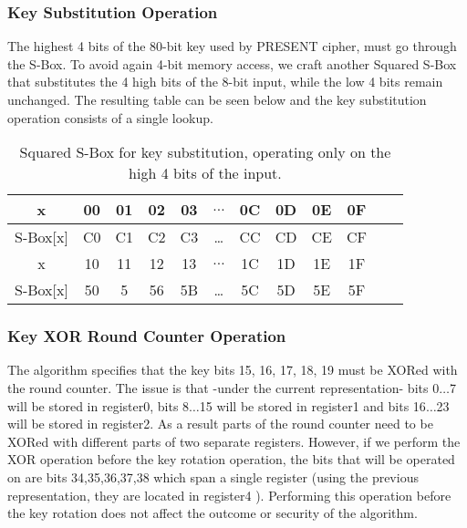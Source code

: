 \documentclass[11pt]{article}
\begin{document}
\subsubsection{Key Substitution Operation}
The highest 4 bits of the 80-bit key used by PRESENT cipher, must go through the S-Box. To avoid again 4-bit memory access, we craft another Squared S-Box that substitutes the 4 high bits of the 8-bit input, while the low 4 bits remain unchanged. The resulting table can be seen below and the key substitution operation consists of a single lookup.

\begin{table}[h]
\centering
\begin{tabular}{| c | c  | c | c | c  | c  | c | c | c  | c | c | c |}
\hline
  x & 00 & 01 & 02 & 03  &  $\dots$  & 0C & 0D & 0E & 0F   \\
\hline
 S-Box[x] & C0 & C1 & C2 & C3 & \dots & CC & CD & CE & CF   \\
\hline
  x & 10 & 11 & 12 & 13  &  $\dots$  & 1C & 1D & 1E & 1F   \\
\hline
 S-Box[x] & 50 & 5 & 56 & 5B & \dots & 5C & 5D & 5E & 5F   \\

\hline
\end{tabular}
 \caption{Squared S-Box for key substitution, operating only on the high 4 bits of the input.}
\end{table}

\subsubsection{Key XOR Round Counter Operation}
The algorithm specifies that the key bits 15, 16, 17, 18, 19 must be XORed with the round counter. The issue is that -under the current representation- bits 0$\dots$7 will be stored in register0, bits 8$\dots$15 will be stored in register1 and bits 16$\dots$23 will be stored in register2. As a result parts of the round counter need to be XORed with different parts of two separate registers. However, if we perform the XOR operation before the key rotation operation, the bits that will be operated on are bits 34,35,36,37,38 which span a single register (using the previous representation, they are located in register4 ). Performing this operation before the key rotation does not affect the outcome or security of the algorithm.
\end{document}
